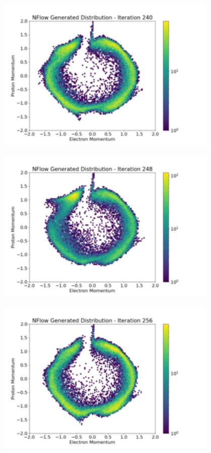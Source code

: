 \documentclass[aspectratio=169]{beamer}
\begin{document}
\begin{frame}[noframenumbering]\centering\includegraphics[width=0.8\textwidth]{images/400training/400training-30.png}\end{frame}
\begin{frame}[noframenumbering]\centering\includegraphics[width=0.8\textwidth]{images/400training/400training-31.png}\end{frame}
\begin{frame}[noframenumbering]\centering\includegraphics[width=0.8\textwidth]{images/400training/400training-32.png}\end{frame}
\end{document}
